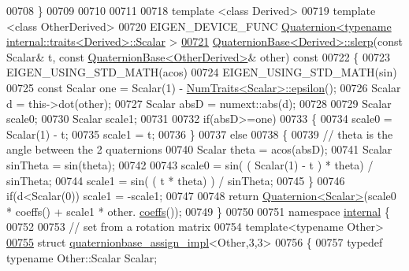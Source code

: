 \begin{DoxyCode}
{00708 \}
00709 
00710  
00711     
00718 \textcolor{keyword}{template} <\textcolor{keyword}{class} Derived>
00719 \textcolor{keyword}{template} <\textcolor{keyword}{class} OtherDerived>
00720 EIGEN\_DEVICE\_FUNC \hyperlink{group___geometry___module_class_eigen_1_1_quaternion}{Quaternion<typename internal::traits<Derived>::Scalar}
      >
\hyperlink{group___geometry___module_a75b89a20708949fab311c3ed7cce1a67}{00721} \hyperlink{group___geometry___module_class_eigen_1_1_quaternion_base}{QuaternionBase<Derived>::slerp}(\textcolor{keyword}{const} Scalar& t, \textcolor{keyword}{const} 
      \hyperlink{group___geometry___module_class_eigen_1_1_quaternion_base}{QuaternionBase<OtherDerived>}& other)\textcolor{keyword}{ const}
00722 \textcolor{keyword}{}\{
00723   EIGEN\_USING\_STD\_MATH(acos)
00724   EIGEN\_USING\_STD\_MATH(sin)
00725   \textcolor{keyword}{const} Scalar one = Scalar(1) - \hyperlink{group___core___module_struct_eigen_1_1_num_traits}{NumTraits<Scalar>::epsilon}();
00726   Scalar d = this->dot(other);
00727   Scalar absD = numext::abs(d);
00728 
00729   Scalar scale0;
00730   Scalar scale1;
00731 
00732   \textcolor{keywordflow}{if}(absD>=one)
00733   \{
00734     scale0 = Scalar(1) - t;
00735     scale1 = t;
00736   \}
00737   \textcolor{keywordflow}{else}
00738   \{
00739     \textcolor{comment}{// theta is the angle between the 2 quaternions}
00740     Scalar theta = acos(absD);
00741     Scalar sinTheta = sin(theta);
00742 
00743     scale0 = sin( ( Scalar(1) - t ) * theta) / sinTheta;
00744     scale1 = sin( ( t * theta) ) / sinTheta;
00745   \}
00746   \textcolor{keywordflow}{if}(d<Scalar(0)) scale1 = -scale1;
00747 
00748   \textcolor{keywordflow}{return} \hyperlink{group___geometry___module_class_eigen_1_1_quaternion}{Quaternion<Scalar>}(scale0 * coeffs() + scale1 * other.
      \hyperlink{group___geometry___module_aa7bb3fc337ffa82b0ad795783eb8a2ce}{coeffs}());
00749 \}
00750 
00751 \textcolor{keyword}{namespace }\hyperlink{namespaceinternal}{internal} \{
00752 
00753 \textcolor{comment}{// set from a rotation matrix}
00754 \textcolor{keyword}{template}<\textcolor{keyword}{typename} Other>
\hyperlink{struct_eigen_1_1internal_1_1quaternionbase__assign__impl_3_01_other_00_013_00_013_01_4}{00755} \textcolor{keyword}{struct }\hyperlink{struct_eigen_1_1internal_1_1quaternionbase__assign__impl}{quaternionbase\_assign\_impl}<Other,3,3>
00756 \{
00757   \textcolor{keyword}{typedef} \textcolor{keyword}{typename} Other::Scalar Scalar;
}
\end{DoxyCode}

